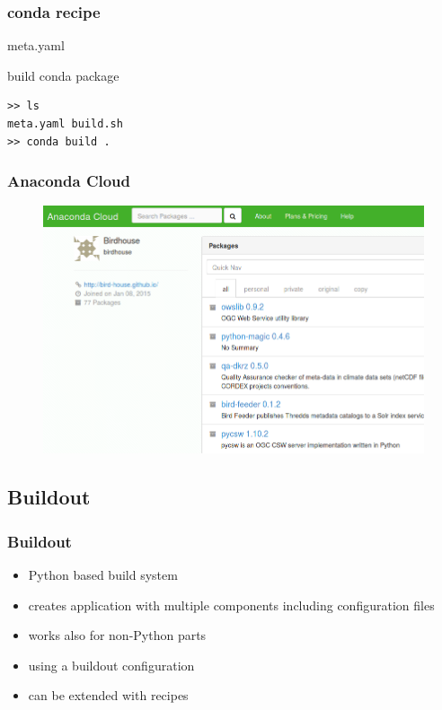 \documentclass{beamer}
\begin{document}

  \begin{frame}[fragile]
    \frametitle{conda recipe}
    \begin{block}{meta.yaml}
      
    \end{block}
    \begin{block}{build conda package}
      \begin{verbatim}
>> ls  
meta.yaml build.sh
>> conda build .
      \end{verbatim}
    \end{block}
\end{frame}


  \begin{frame}[plain]
    \frametitle{Anaconda Cloud}
    \begin{figure}
      \includegraphics[width=11.5cm]{images/anaconda-cloud.png}
    \end{figure}
  \end{frame}


  \subsection{Buildout}


  \begin{frame}
    \frametitle{Buildout}
    \begin{itemize}
      \item Python based build system
      \item creates application with multiple components including configuration files
      \item works also for non-Python parts
      \item using a buildout configuration 
      \item can be extended with recipes
    \end{itemize}
  \end{frame}
\end{document}
